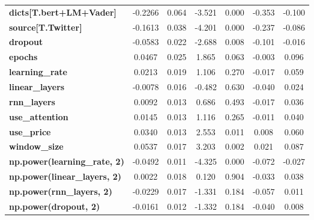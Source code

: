\begin{center}
\begin{tabular}{lcccccc}
\textbf{dicts[T.bert+LM+Vader]}      &      -0.2266  &        0.064     &    -3.521  &         0.000        &       -0.353    &       -0.100     \\
\textbf{source[T.Twitter]}           &      -0.1613  &        0.038     &    -4.201  &         0.000        &       -0.237    &       -0.086     \\
\textbf{dropout}                     &      -0.0583  &        0.022     &    -2.688  &         0.008        &       -0.101    &       -0.016     \\
\textbf{epochs}                      &       0.0467  &        0.025     &     1.865  &         0.063        &       -0.003    &        0.096     \\
\textbf{learning\_rate}              &       0.0213  &        0.019     &     1.106  &         0.270        &       -0.017    &        0.059     \\
\textbf{linear\_layers}              &      -0.0078  &        0.016     &    -0.482  &         0.630        &       -0.040    &        0.024     \\
\textbf{rnn\_layers}                 &       0.0092  &        0.013     &     0.686  &         0.493        &       -0.017    &        0.036     \\
\textbf{use\_attention}              &       0.0145  &        0.013     &     1.116  &         0.265        &       -0.011    &        0.040     \\
\textbf{use\_price}                  &       0.0340  &        0.013     &     2.553  &         0.011        &        0.008    &        0.060     \\
\textbf{window\_size}                &       0.0537  &        0.017     &     3.203  &         0.002        &        0.021    &        0.087     \\
\textbf{np.power(learning\_rate, 2)} &      -0.0492  &        0.011     &    -4.325  &         0.000        &       -0.072    &       -0.027     \\
\textbf{np.power(linear\_layers, 2)} &       0.0022  &        0.018     &     0.120  &         0.904        &       -0.033    &        0.038     \\
\textbf{np.power(rnn\_layers, 2)}    &      -0.0229  &        0.017     &    -1.331  &         0.184        &       -0.057    &        0.011     \\
\textbf{np.power(dropout, 2)}        &      -0.0161  &        0.012     &    -1.332  &         0.184        &       -0.040    &        0.008     \\

\end{tabular}
\end{center}
